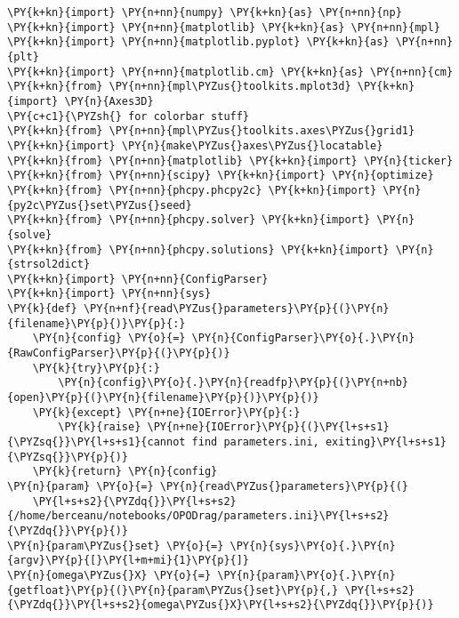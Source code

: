 
\begin{Verbatim}[commandchars=\\\{\}]
\PY{k+kn}{import} \PY{n+nn}{numpy} \PY{k+kn}{as} \PY{n+nn}{np}
\PY{k+kn}{import} \PY{n+nn}{matplotlib} \PY{k+kn}{as} \PY{n+nn}{mpl}
\PY{k+kn}{import} \PY{n+nn}{matplotlib.pyplot} \PY{k+kn}{as} \PY{n+nn}{plt}
\PY{k+kn}{import} \PY{n+nn}{matplotlib.cm} \PY{k+kn}{as} \PY{n+nn}{cm}
\PY{k+kn}{from} \PY{n+nn}{mpl\PYZus{}toolkits.mplot3d} \PY{k+kn}{import} \PY{n}{Axes3D}
\PY{c+c1}{\PYZsh{} for colorbar stuff}
\PY{k+kn}{from} \PY{n+nn}{mpl\PYZus{}toolkits.axes\PYZus{}grid1} \PY{k+kn}{import} \PY{n}{make\PYZus{}axes\PYZus{}locatable}
\PY{k+kn}{from} \PY{n+nn}{matplotlib} \PY{k+kn}{import} \PY{n}{ticker}
\PY{k+kn}{from} \PY{n+nn}{scipy} \PY{k+kn}{import} \PY{n}{optimize}
\PY{k+kn}{from} \PY{n+nn}{phcpy.phcpy2c} \PY{k+kn}{import} \PY{n}{py2c\PYZus{}set\PYZus{}seed}
\PY{k+kn}{from} \PY{n+nn}{phcpy.solver} \PY{k+kn}{import} \PY{n}{solve}
\PY{k+kn}{from} \PY{n+nn}{phcpy.solutions} \PY{k+kn}{import} \PY{n}{strsol2dict}
\PY{k+kn}{import} \PY{n+nn}{ConfigParser}
\PY{k+kn}{import} \PY{n+nn}{sys}
\PY{k}{def} \PY{n+nf}{read\PYZus{}parameters}\PY{p}{(}\PY{n}{filename}\PY{p}{)}\PY{p}{:}
    \PY{n}{config} \PY{o}{=} \PY{n}{ConfigParser}\PY{o}{.}\PY{n}{RawConfigParser}\PY{p}{(}\PY{p}{)}
    \PY{k}{try}\PY{p}{:}
        \PY{n}{config}\PY{o}{.}\PY{n}{readfp}\PY{p}{(}\PY{n+nb}{open}\PY{p}{(}\PY{n}{filename}\PY{p}{)}\PY{p}{)}
    \PY{k}{except} \PY{n+ne}{IOError}\PY{p}{:}
        \PY{k}{raise} \PY{n+ne}{IOError}\PY{p}{(}\PY{l+s+s1}{\PYZsq{}}\PY{l+s+s1}{cannot find parameters.ini, exiting}\PY{l+s+s1}{\PYZsq{}}\PY{p}{)}
    \PY{k}{return} \PY{n}{config}
\PY{n}{param} \PY{o}{=} \PY{n}{read\PYZus{}parameters}\PY{p}{(}
    \PY{l+s+s2}{\PYZdq{}}\PY{l+s+s2}{/home/berceanu/notebooks/OPODrag/parameters.ini}\PY{l+s+s2}{\PYZdq{}}\PY{p}{)}
\PY{n}{param\PYZus{}set} \PY{o}{=} \PY{n}{sys}\PY{o}{.}\PY{n}{argv}\PY{p}{[}\PY{l+m+mi}{1}\PY{p}{]}
\PY{n}{omega\PYZus{}X} \PY{o}{=} \PY{n}{param}\PY{o}{.}\PY{n}{getfloat}\PY{p}{(}\PY{n}{param\PYZus{}set}\PY{p}{,} \PY{l+s+s2}{\PYZdq{}}\PY{l+s+s2}{omega\PYZus{}X}\PY{l+s+s2}{\PYZdq{}}\PY{p}{)}

\end{Verbatim}

